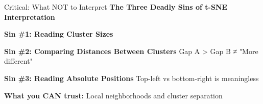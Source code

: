 \documentclass[10pt]{beamer}
\newcommand{\emphtext}[1]{\textcolor{upcblue}{\textbf{#1}}}
\newcommand{\conceptbox}[1]{\colorbox{upcblue!10}{\begin{minipage}{0.85\textwidth}\centering #1\end{minipage}}}
\begin{document}
\begin{frame}{Critical: What NOT to Interpret}
\emphtext{The Three Deadly Sins of t-SNE Interpretation}

\vspace{0.3cm}
\textbf{Sin \#1: Reading Cluster Sizes}
\begin{center}
\end{center}

\vspace{0.2cm}
\textbf{Sin \#2: Comparing Distances Between Clusters}
\footnotesize
Gap A > Gap B ≠ "More different"

\vspace{0.2cm}
\textbf{Sin \#3: Reading Absolute Positions}
\footnotesize
Top-left vs bottom-right is meaningless

\vspace{0.3cm}
\begin{center}
\conceptbox{\footnotesize\textbf{What you CAN trust:} Local neighborhoods and cluster separation}
\end{center}
\end{frame}
\end{document}

